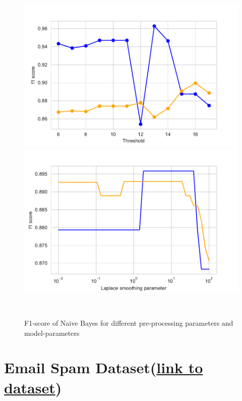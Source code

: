 \documentclass[11pt]{article}
\begin{document}
\begin{figure}
\begin{minipage}[l]{0.3\textwidth}
\includegraphics[width=1\linewidth]{voting/thresholds_nb.pdf}
\end{minipage}
\begin{minipage}[l]{0.3\textwidth}
\includegraphics[width=1\linewidth]{voting/laplace_nb.pdf}
\end{minipage}
\begin{minipage}[l]{0.3\textwidth}
\end{minipage}\\
   \caption{F1-score of Naive Bayes for different pre-processing parameters and model-parameters}
\label{votingfig_fig6}
\end{figure}



\section{Email Spam Dataset(\href{https://www.kaggle.com/nitishabharathi/email-spam-dataset}{link to dataset})}
\end{document}
